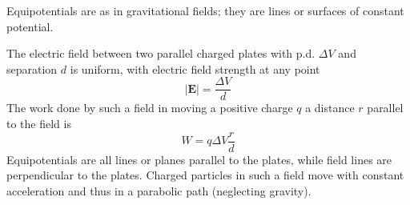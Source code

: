 \documentclass[Physics.tex]{subfiles}
\begin{document}
Equipotentials are as in gravitational fields; they are lines or surfaces of constant potential.

The electric field between two parallel charged plates with p.d. \(\Delta V\) and separation \(d\) is uniform, with electric field strength at any point \begin{equation}\left|\mathbf{E}\right| = \frac{\Delta V}{d}\end{equation} The work done by such a field in moving a positive charge \(q\) a distance \(r\) parallel to the field is \[W = q\Delta V\frac{r}{d}\] Equipotentials are all lines or planes parallel to the plates, while field lines are perpendicular to the plates. Charged particles in such a field move with constant acceleration and thus in a parabolic path (neglecting gravity).
\end{document}
